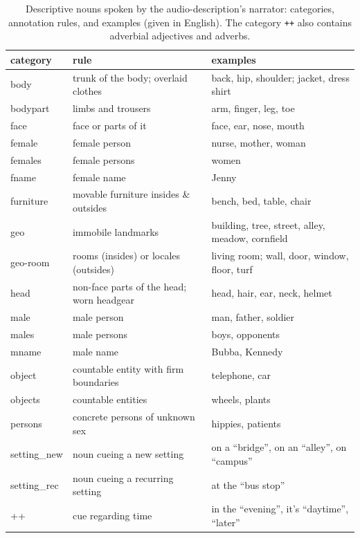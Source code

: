 \documentclass[english]{article}
\begin{document}
\begin{table}[t]
    \caption{Descriptive nouns spoken by the audio-description's narrator:
    categories, annotation rules, and examples (given in English). The category
    \texttt{++} also contains adverbial adjectives and adverbs.}
\label{tab:descr-nouns-rules}
\begin{tabular}{lll}
\toprule
\textbf{category} & \textbf{rule} & \textbf{examples} \\
\midrule
body & trunk of the body; overlaid clothes & back, hip, shoulder; jacket, dress
shirt \tabularnewline
bodypart & limbs and trousers & arm, finger, leg, toe \tabularnewline
face & face or parts of it & face, ear, nose, mouth \tabularnewline
female & female person & nurse, mother, woman \tabularnewline
females & female persons & women \tabularnewline
fname & female name & Jenny \tabularnewline
furniture & movable furniture insides \& outsides & bench, bed, table, chair
\tabularnewline
geo & immobile landmarks & building, tree, street, alley, meadow, cornfield \tabularnewline
geo-room & rooms (insides) or  locales (outsides) & living room; wall, door, window, floor, turf \tabularnewline
head & non-face parts of the head; worn headgear & head, hair, ear, neck,
helmet \tabularnewline
male & male person & man, father, soldier \tabularnewline
males & male persons & boys, opponents \tabularnewline
mname & male name & Bubba, Kennedy \tabularnewline
object & countable entity with firm boundaries & telephone, car \tabularnewline
objects & countable entities & wheels, plants \tabularnewline
persons & concrete persons of unknown sex & hippies, patients \tabularnewline
setting\_new & noun cueing a new setting &  on a ``bridge'', on an ``alley'', on ``campus'' \tabularnewline
setting\_rec & noun cueing a recurring setting & at the ``bus stop'' \tabularnewline
++ & cue regarding time & in the ``evening'', it's ``daytime'', ``later'' \tabularnewline

\bottomrule
\end{tabular}
\end{table}
\end{document}

